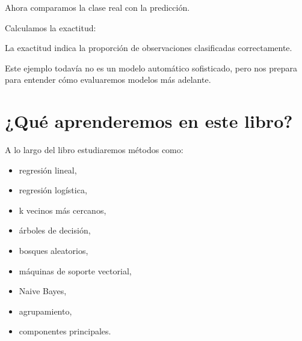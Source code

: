 \documentclass[
  11pt,
  letterpaper,
]{book}
\newenvironment{Shaded}{\begin{snugshade}}{\end{snugshade}}
\newcommand{\AttributeTok}[1]{\textcolor[rgb]{0.40,0.45,0.13}{#1}}
\newcommand{\FunctionTok}[1]{\textcolor[rgb]{0.28,0.35,0.67}{#1}}
\newcommand{\NormalTok}[1]{\textcolor[rgb]{0.00,0.23,0.31}{#1}}
\newcommand{\OtherTok}[1]{\textcolor[rgb]{0.00,0.23,0.31}{#1}}
\newcommand{\SpecialCharTok}[1]{\textcolor[rgb]{0.37,0.37,0.37}{#1}}
\providecommand{\tightlist}{%
  \setlength{\itemsep}{0pt}\setlength{\parskip}{0pt}}
\begin{document}
Ahora comparamos la clase real con la predicción.

\begin{Shaded}
\end{Shaded}

Calculamos la exactitud:

\begin{Shaded}
\end{Shaded}

La exactitud indica la proporción de observaciones clasificadas
correctamente.

Este ejemplo todavía no es un modelo automático sofisticado, pero nos
prepara para entender cómo evaluaremos modelos más adelante.

\section{¿Qué aprenderemos en este
libro?}\label{quuxe9-aprenderemos-en-este-libro}

A lo largo del libro estudiaremos métodos como:

\begin{itemize}
\tightlist
\item
  regresión lineal,
\item
  regresión logística,
\item
  k vecinos más cercanos,
\item
  árboles de decisión,
\item
  bosques aleatorios,
\item
  máquinas de soporte vectorial,
\item
  Naive Bayes,
\item
  agrupamiento,
\item
  componentes principales.
\end{itemize}
\end{document}
